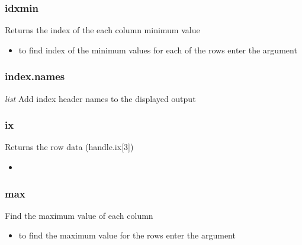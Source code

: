 %
\subsubsection{idxmin}
Returns the index of the each column minimum value
  \begin{itemize}

    \item to find index of the minimum values for each of the rows enter
      the argument \color{red}{axis=1}
  \end{itemize}

%
\subsubsection{index.names}
\textit{list} Add index header names to the displayed output

%
\subsubsection{ix}
Returns the row data (handle.ix[3])
  \begin{itemize}

    \item \color{red}{if additional rows and columns are added using this
      command it will have the same effect as calling reindex.}
  \end{itemize}

%
\subsubsection{max}
Find the maximum value of each column
  \begin{itemize}

    \item to find the maximum value for the rows enter the argument
      \color{red}{axis=1}
  \end{itemize}

%
